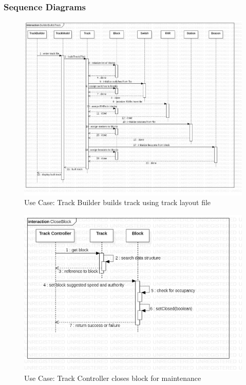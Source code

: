 \documentclass{article}
\begin{document}
    \subsubsection{Sequence Diagrams}
    \begin{figure}[H]
        \centering
        \includegraphics[width=\textwidth]{./SequenceDiagrams/TrackModel_SeqDiagrams/TrackModel_SeqDiagram_BuilderBuildsTrack.png}
        \caption{Use Case: Track Builder builds track using track layout file}
        \label{fig:Track Builder Builds Track}
    \end{figure}
    \begin{figure}[H]
        \centering
        \includegraphics[width=\textwidth]{./SequenceDiagrams/TrackModel_SeqDiagrams/TrackModel_SeqDiagram_CloseBlock.png}
        \caption{Use Case: Track Controller closes block for maintenance}
        \label{fig:Track Controller Closes Block}
    \end{figure}
\end{document}
